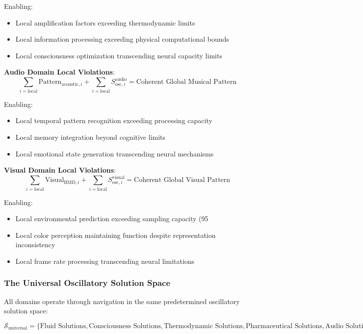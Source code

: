 \documentclass[11pt,a4paper]{article}
\theoremstyle{remark}
\begin{document}
Enabling:
\begin{itemize}
\item Local amplification factors exceeding thermodynamic limits
\item Local information processing exceeding physical computational bounds
\item Local consciousness optimization transcending neural capacity limits
\end{itemize}

\textbf{Audio Domain Local Violations}:
$$\sum_{i=\text{local}} \text{Pattern}_{\text{acoustic},i} + \sum_{i=\text{local}} S_{\text{osc},i}^{\text{audio}} = \text{Coherent Global Musical Pattern}$$

Enabling:
\begin{itemize}
\item Local temporal pattern recognition exceeding processing capacity
\item Local memory integration beyond cognitive limits
\item Local emotional state generation transcending neural mechanisms
\end{itemize}

\textbf{Visual Domain Local Violations}:
$$\sum_{i=\text{local}} \text{Visual}_{\text{BMD},i} + \sum_{i=\text{local}} S_{\text{osc},i}^{\text{visual}} = \text{Coherent Global Visual Pattern}$$

Enabling:
\begin{itemize}
\item Local environmental prediction exceeding sampling capacity (95%
\item Local color perception maintaining function despite representation inconsistency
\item Local frame rate processing transcending neural limitations
\end{itemize}

\subsubsection{The Universal Oscillatory Solution Space}

All domains operate through navigation in the same predetermined oscillatory solution space:

\begin{equation}
\mathcal{S}_{\text{universal}} = \{\text{Fluid Solutions}, \text{Consciousness Solutions}, \text{Thermodynamic Solutions}, \text{Pharmaceutical Solutions}, \text{Audio Solutions}, \text{Visual Solutions}\}
\end{equation}
\end{document}
